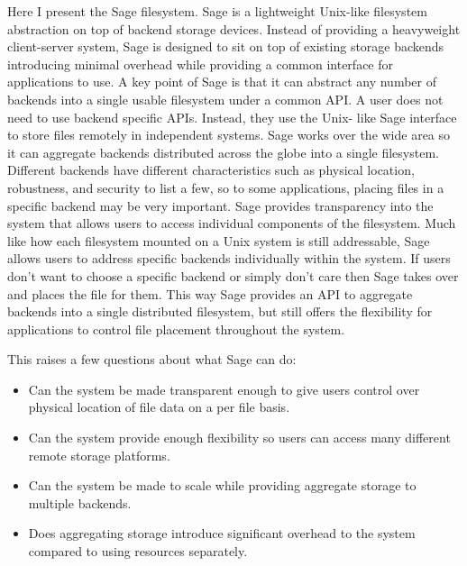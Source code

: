 
Here I present the Sage filesystem. Sage is a lightweight Unix-like filesystem
abstraction on top of backend storage devices. Instead of providing a
heavyweight client-server system, Sage is designed to sit on top of existing
storage backends introducing minimal overhead while providing a common
interface for applications to use. A key point of Sage is that it can abstract
any number of backends into a single usable filesystem under a common API. A
user does not need to use backend specific APIs. Instead, they use the Unix-
like Sage interface to store files remotely in independent systems. Sage works
over the wide area so it can aggregate backends distributed across the globe
into a single filesystem. Different backends have different characteristics
such as physical location, robustness, and security to list a few, so to some
applications, placing files in a specific backend may be very important. Sage
provides transparency into the system that allows users to access individual
components of the filesystem. Much like how each filesystem mounted on a Unix
system is still addressable, Sage allows users to address specific backends
individually within the system. If users don’t want to choose a specific
backend or simply don’t care then Sage takes over and places the file for
them. This way Sage provides an API to aggregate backends into a single
distributed filesystem, but still offers the flexibility for applications to
control file placement throughout the system.

This raises a few questions about what Sage can do:
\begin{itemize}
\item Can the system be made transparent enough to give users control over physical location of file data on a per file basis.

\item Can the system provide enough flexibility so users can access many different remote storage platforms.

\item Can the system be made to scale while providing aggregate storage to multiple backends.

\item Does aggregating storage introduce significant overhead to the system compared to using resources separately.
\end{itemize}

